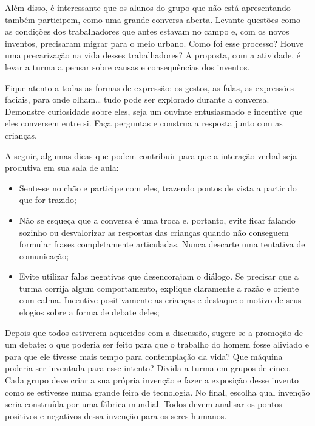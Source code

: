 \documentclass[11pt]{extarticle}
\begin{document}
Além disso, é interessante que os alunos do grupo que não está apresentando também participem, como uma grande conversa aberta. Levante questões como as condições dos trabalhadores que antes estavam no campo e, com os novos inventos, precisaram migrar para o meio urbano. Como foi esse processo? Houve uma precarização na vida desses trabalhadores? A proposta, com a atividade, é levar a turma a pensar sobre causas e consequências dos inventos. 

Fique atento a todas as formas de expressão: os gestos, as falas, as 
expressões faciais, para onde olham\ldots{} tudo pode ser explorado durante a conversa. 
Demonstre curiosidade sobre eles, seja um ouvinte entusiasmado e incentive que eles 
conversem entre si. Faça perguntas e construa a resposta junto com as crianças. 

A seguir, algumas dicas que podem contribuir para que a interação verbal seja produtiva em sua sala de aula: 

\begin{itemize}
\item Sente-se no chão e participe com eles, trazendo pontos de vista a partir do que for trazido;

\item Não se esqueça que a conversa é uma troca e, portanto, evite ficar falando sozinho ou desvalorizar as respostas das 
crianças quando não conseguem formular frases completamente articuladas. Nunca descarte uma tentativa de comunicação; 

\item Evite utilizar falas negativas que desencorajam o diálogo. Se precisar que a turma corrija algum comportamento, explique claramente a razão e oriente com calma. Incentive positivamente as crianças e destaque o motivo de seus elogios sobre a forma de debate deles; 

\end{itemize}

Depois que todos estiverem aquecidos com a discussão, sugere-se a promoção de um debate: o que poderia ser feito para que o trabalho do homem fosse aliviado e para que ele tivesse mais tempo para contemplação da vida? Que máquina poderia ser inventada para esse intento? Divida a turma em grupos de cinco. Cada grupo deve criar a sua própria invenção e fazer a exposição desse invento como se estivesse numa grande feira de tecnologia. No final, escolha qual invenção seria construída por uma fábrica mundial. Todos devem analisar os pontos positivos e negativos dessa invenção para os seres humanos.
\end{document}
